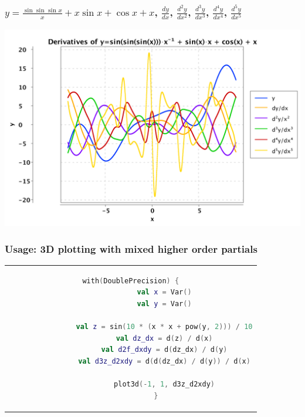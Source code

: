 \documentclass{beamer}
\begin{document}
    \begin{frame}
        \frametitle{$y = \frac{\sin{\sin{\sin{x}}}}{x} + x \sin{x} + \cos{x} + x$, $\frac{dy}{dx}$, $\frac{d^{2}y}{dx^2}$, $\frac{d^{3}y}{dx^3}$, $\frac{d^{4}y}{dx^4}$, $\frac{d^{5}y}{dx^5}$}
        \begin{center}
            \includegraphics[scale=0.55]{../figures/plot.png}
        \end{center}
    \end{frame}

    \begin{frame}[fragile]
        \frametitle{Usage: 3D plotting with mixed higher order partials}

        \begin{center}
            \begin{tabular}{c}
        \begin{lstlisting}[language=Kotlin, gobble=12]
            with(DoublePrecision) {
                val x = Var()
                val y = Var()

                val z = sin(10 * (x * x + pow(y, 2))) / 10
                val dz_dx = d(z) / d(x)
                val d2f_dxdy = d(dz_dx) / d(y)
                val d3z_d2xdy = d(d(dz_dx) / d(y)) / d(x)

                plot3d(-1, 1, d3z_d2xdy)
            }
        \end{lstlisting}
            \end{tabular}
        \end{center}
    \end{frame}
\end{document}
